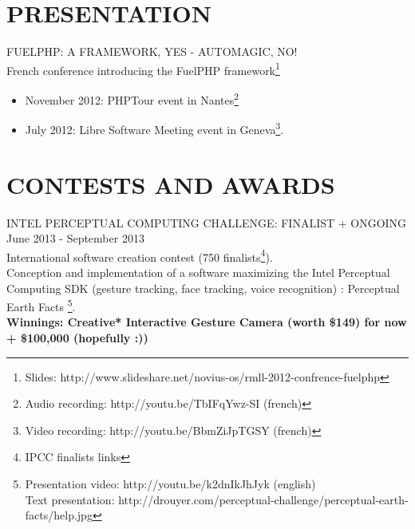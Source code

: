 \documentclass[11pt]{res} %
\begin{document}
\begin{resume}
\section{PRESENTATION} 

FUELPHP: A FRAMEWORK, YES - AUTOMAGIC, NO! \\
French conference introducing the FuelPHP framework\footnote{Slides: http://www.slideshare.net/novius-os/rmll-2012-confrence-fuelphp}
\vspace{0.05in}
 \begin{itemize} \itemsep -2pt
  \item November 2012: PHPTour event in Nantes\footnote{Audio recording: http://youtu.be/TbIFqYwz-SI (french)}
  \item July 2012: Libre Software Meeting event in Geneva\footnote{Video recording: http://youtu.be/BbmZiJpTGSY (french)}.
\end{itemize} 
 

\section{CONTESTS AND AWARDS} 
 
INTEL PERCEPTUAL COMPUTING CHALLENGE: FINALIST + ONGOING \\
June 2013 - September 2013 \\
International software creation contest  (750 finalists\footnote{IPCC finalists links}). \\
Conception and implementation of a software maximizing the Intel Perceptual Computing SDK
(gesture tracking, face tracking, voice recognition) : Perceptual Earth Facts \footnote{Presentation video: http://youtu.be/k2dnIkJhJyk (english) \\
Text presentation: http://drouyer.com/perceptual-challenge/perceptual-earth-facts/help.jpg}. \\
{\bf Winnings: Creative* Interactive Gesture Camera (worth \$149) for now + \$100,000 (hopefully :))}


\end{resume}
\end{document}

